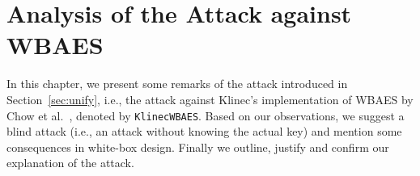\chapter{Analysis of the Attack against WBAES}
\label{chap:analysis}

In this chapter, we present some remarks of the attack introduced in Section~\ref{sec:unify}, i.e., the attack against Klinec's implementation \cite{klinec2013implementation} of WBAES by Chow et al.\ \cite{chow2002aes}, denoted by {\tt KlinecWBAES}. Based on our observations, we suggest a blind attack (i.e., an attack without knowing the actual key) and mention some consequences in white-box design. %
Finally we outline, justify and confirm our explanation of the attack.








